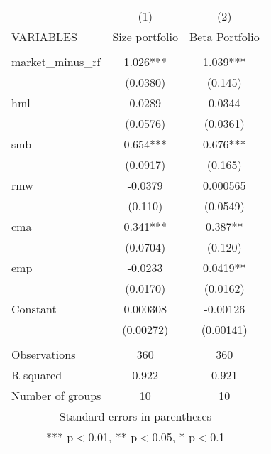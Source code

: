 \begin{tabular}{lcc} \hline
 & (1) & (2) \\
VARIABLES & Size portfolio & Beta Portfolio \\ \hline
 &  &  \\
market\_minus\_rf & 1.026*** & 1.039*** \\
 & (0.0380) & (0.145) \\
hml & 0.0289 & 0.0344 \\
 & (0.0576) & (0.0361) \\
smb & 0.654*** & 0.676*** \\
 & (0.0917) & (0.165) \\
rmw & -0.0379 & 0.000565 \\
 & (0.110) & (0.0549) \\
cma & 0.341*** & 0.387** \\
 & (0.0704) & (0.120) \\
emp & -0.0233 & 0.0419** \\
 & (0.0170) & (0.0162) \\
Constant & 0.000308 & -0.00126 \\
 & (0.00272) & (0.00141) \\
 &  &  \\
Observations & 360 & 360 \\
R-squared & 0.922 & 0.921 \\
 Number of groups & 10 & 10 \\ \hline
\multicolumn{3}{c}{ Standard errors in parentheses} \\
\multicolumn{3}{c}{ *** p$<$0.01, ** p$<$0.05, * p$<$0.1} \\
\end{tabular}
